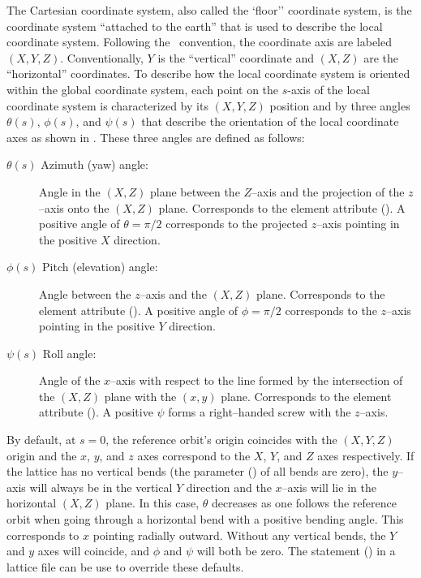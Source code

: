 The Cartesian  coordinate system, also called the `floor'' coordinate system, is the
coordinate system ``attached to the earth'' that is used to describe the local coordinate
system. Following the \mad\ convention, the  coordinate axis are labeled $(X, Y,
Z)$. Conventionally, $Y$ is the ``vertical'' coordinate and $(X, Z)$ are the ``horizontal''
coordinates. To describe how the local coordinate system is oriented within the global coordinate
system, each point on the $s$-axis of the local coordinate system is characterized by its $(X, Y,
Z)$ position and by three angles $\theta(s)$, $\phi(s)$, and $\psi(s)$ that describe the orientation
of the local coordinate axes as shown in . These three angles are defined as
follows:
\begin{description}
%
\item[$\theta(s)$ Azimuth (yaw) angle:] 
Angle in the $(X, Z)$ plane between the $Z$--axis and the projection of the $z$--axis onto the $(X,
Z)$ plane. Corresponds to the  element attribute (). A positive angle of
$\theta = \pi/2$ corresponds to the projected $z$--axis pointing in the positive $X$ direction.
%
\item[$\phi(s)$ Pitch (elevation) angle:] 
Angle between the $z$--axis and the $(X,Z)$ plane. Corresponds to the  element attribute
(). A positive angle of $\phi = \pi/2$ corresponds to the $z$--axis pointing in the
positive $Y$ direction.
%
\item[$\psi(s)$ Roll angle:] 
Angle of the $x$--axis with respect to the line formed by the intersection of the $(X, Z)$ plane
with the $(x, y)$ plane. Corresponds to the  element attribute (). A
positive $\psi$ forms a right--handed screw with the $z$--axis.
\end{description}

By default, at $s = 0$, the reference orbit's origin coincides with the $(X, Y, Z)$ origin and the
$x$, $y$, and $z$ axes correspond to the $X$, $Y$, and $Z$ axes respectively. If the lattice has no
vertical bends (the  parameter () of all bends are zero), the $y$--axis
will always be in the vertical $Y$ direction and the $x$--axis will lie in the horizontal $(X,Z)$
plane. In this case, $\theta$ decreases as one follows the reference orbit when going through a
horizontal bend with a positive bending angle. This corresponds to $x$ pointing radially
outward. Without any vertical bends, the $Y$ and $y$ axes will coincide, and $\phi$ and $\psi$ will
both be zero. The  statement () in a lattice file can be use to
override these defaults.

